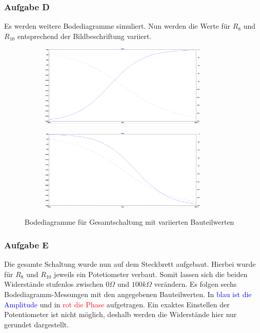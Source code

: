 \subsubsection{Aufgabe D}
\label{D}
Es werden weitere Bodediagramme simuliert. Nun werden die Werte für $R_{8}$ und $R_{10}$ entsprechend der Bildbeschriftung variiert.
\begin{figure}[h]
\centering
\begin{subfigure}{.5\textwidth}
  \centering
  \includegraphics[width=8cm]{pics/10_90}
  \label{Bode1090}
\end{subfigure}%
\begin{subfigure}{.5\textwidth}
  \centering
  \includegraphics[width=8cm]{pics/90_10}
  \label{Bode9010}
\end{subfigure}
\caption{Bodediagramme für Gesamtschaltung mit variierten Bauteilwerten}
\end{figure}

\newpage
\subsubsection{Aufgabe E}
\label{E}
Die gesamte Schaltung wurde nun auf dem Steckbrett aufgebaut. Hierbei wurde für $R_{8}$ und $R_{10}$ jeweils ein Potetiometer verbaut. Somit lassen sich die beiden Widerstände stufenlos zwischen $\si{0}{\Omega}$ und $\si{100}{k\Omega}$ verändern. Es folgen sechs Bodediagramm-Messungen mit den angegebenen Bauteilwerten. In \textcolor{blue}{blau ist die Amplitude} und in \textcolor{red}{rot die Phase} aufgetragen. Ein exaktes Einstellen der Potentiometer ist nicht möglich, deshalb werden die Widerstände hier nur gerundet dargestellt.

